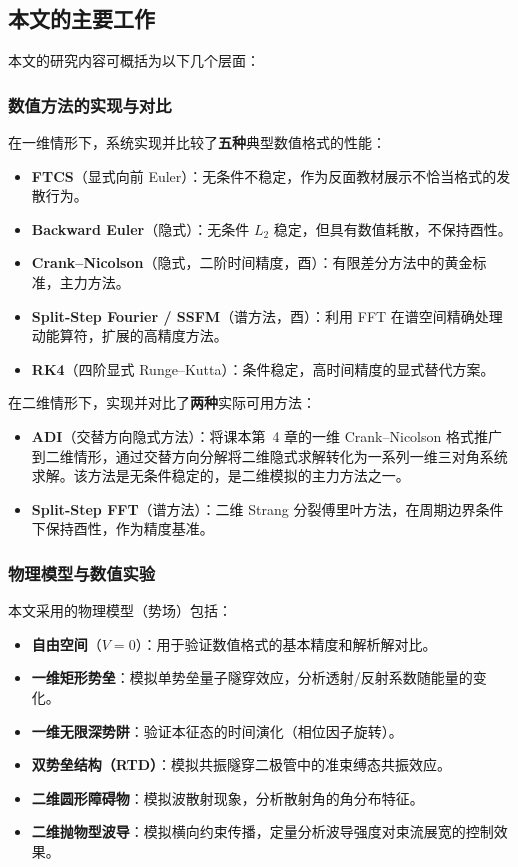 \documentclass[12pt,a4paper]{article}
\begin{document}
\subsection{本文的主要工作}

本文的研究内容可概括为以下几个层面：

\subsubsection{数值方法的实现与对比}

在一维情形下，系统实现并比较了\textbf{五种}典型数值格式的性能：
\begin{itemize}
    \item \textbf{FTCS}（显式向前 Euler）：无条件不稳定，作为反面教材展示不恰当格式的发散行为。
    \item \textbf{Backward Euler}（隐式）：无条件 $L_2$ 稳定，但具有数值耗散，不保持酉性。
    \item \textbf{Crank--Nicolson}（隐式，二阶时间精度，酉）：有限差分方法中的黄金标准，主力方法。
    \item \textbf{Split-Step Fourier / SSFM}（谱方法，酉）：利用 FFT 在谱空间精确处理动能算符，扩展的高精度方法。
    \item \textbf{RK4}（四阶显式 Runge--Kutta）：条件稳定，高时间精度的显式替代方案。
\end{itemize}

在二维情形下，实现并对比了\textbf{两种}实际可用方法：
\begin{itemize}
    \item \textbf{ADI}（交替方向隐式方法）：将课本第~4 章的一维 Crank--Nicolson 格式推广到二维情形，通过交替方向分解将二维隐式求解转化为一系列一维三对角系统求解。该方法是无条件稳定的，是二维模拟的主力方法之一。
    \item \textbf{Split-Step FFT}（谱方法）：二维 Strang 分裂傅里叶方法，在周期边界条件下保持酉性，作为精度基准。
\end{itemize}

\subsubsection{物理模型与数值实验}

本文采用的物理模型（势场）包括：
\begin{itemize}
    \item \textbf{自由空间}（$V=0$）：用于验证数值格式的基本精度和解析解对比。
    \item \textbf{一维矩形势垒}：模拟单势垒量子隧穿效应，分析透射/反射系数随能量的变化。
    \item \textbf{一维无限深势阱}：验证本征态的时间演化（相位因子旋转）。
    \item \textbf{双势垒结构（RTD）}：模拟共振隧穿二极管中的准束缚态共振效应。
    \item \textbf{二维圆形障碍物}：模拟波散射现象，分析散射角的角分布特征。
    \item \textbf{二维抛物型波导}：模拟横向约束传播，定量分析波导强度对束流展宽的控制效果。
\end{itemize}
\end{document}
